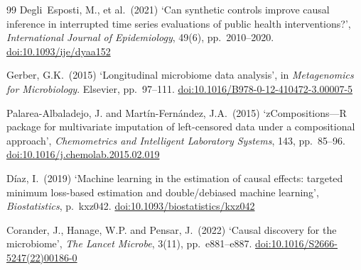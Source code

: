 \documentclass[11pt]{article}
\newcommand{\doi}[1]{\href{https://doi.org/#1}{doi:#1}}
\begin{document}
\begin{thebibliography}{99}
Degli~Esposti, M., et al.\ (2021) `Can synthetic controls improve causal inference in interrupted
time series evaluations of public health interventions?', \textit{International Journal of
Epidemiology}, 49(6), pp.\ 2010--2020. \doi{10.1093/ije/dyaa152}


Gerber, G.K.\ (2015) `Longitudinal microbiome data analysis', in \textit{Metagenomics for Microbiology}. Elsevier, pp.\ 97--111. \doi{10.1016/B978-0-12-410472-3.00007-5}


Palarea-Albaladejo, J. and Mart\'in-Fern\'andez, J.A.\ (2015) `zCompositions---R package for multivariate imputation of left-censored data under a compositional approach', \textit{Chemometrics and Intelligent Laboratory Systems}, 143, pp.\ 85--96. \doi{10.1016/j.chemolab.2015.02.019}


D\'iaz, I.\ (2019) `Machine learning in the estimation of causal effects: targeted minimum loss-based estimation and double/debiased machine learning', \textit{Biostatistics}, p.\ kxz042. \doi{10.1093/biostatistics/kxz042}


Corander, J., Hanage, W.P. and Pensar, J.\ (2022) `Causal discovery for the microbiome', \textit{The Lancet Microbe}, 3(11), pp.\ e881--e887. \doi{10.1016/S2666-5247(22)00186-0}


\end{thebibliography}
\end{document}

